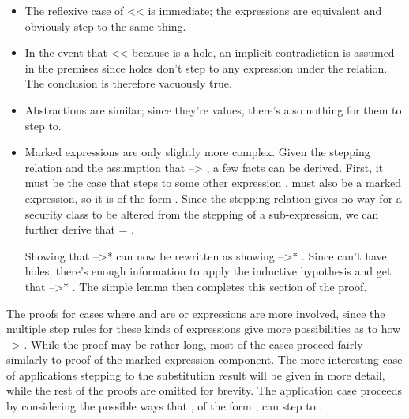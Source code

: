 \documentclass[12pt]{report}
\begin{document}
\begin{itemize}
\item  The reflexive case of  <<  is immediate; the expressions are
  equivalent and obviously step to the same thing.



\item  In the event that  <<  because  is a hole, an implicit
  contradiction is assumed in the premises since holes don't step to
  any expression under the  relation. The conclusion is
  therefore vacuously true.



\item  Abstractions are similar; since they're values, there's also
  nothing for them to step to.



\item  Marked expressions are only slightly more complex. Given the
  stepping relation and the assumption that    -->
  , a few facts can be derived. First, it must be the case that
   steps to some other expression .  must also be
  a marked expression, so it is of the form  
  . Since the stepping relation gives no way for a security
  class to be altered from the stepping of a sub-expression, we can
  further derive that  = .


  Showing that  -->*  can now be rewritten as showing 
    -->*   . Since  can't have
  holes, there's enough information to apply the inductive hypothesis
  and get that  -->* . The simple lemma
   then completes this section of the
  proof. 
\end{itemize}


 The proofs for cases where  and  are  or 
expressions are more involved, since the multiple step rules for
these kinds of expressions give more possibilities as to how  -->
. While the proof may be rather long, most of the cases proceed
fairly similarly to proof of the marked expression component. The
more interesting case of applications stepping to the substitution
result will be given in more detail, while the rest of the proofs are
omitted for brevity. The application case proceeds by considering the
possible ways that , of the form   , can step to
.
\end{document}
